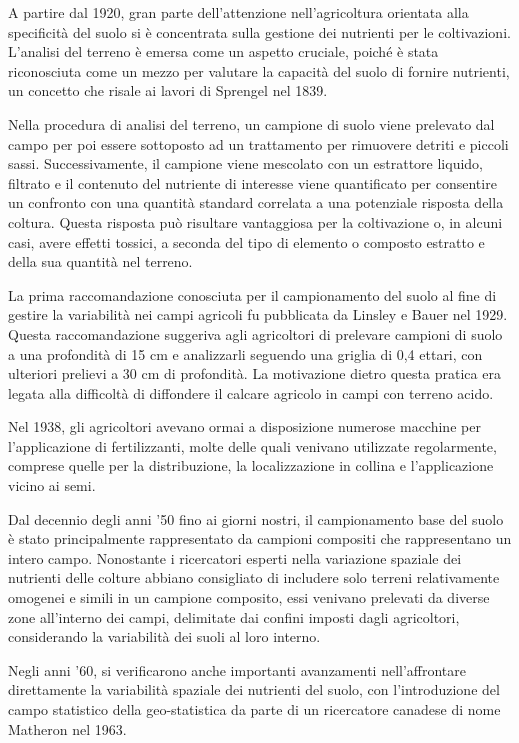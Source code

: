 A partire dal 1920, gran parte dell'attenzione nell'agricoltura orientata alla specificità del suolo si è concentrata sulla gestione dei nutrienti per le coltivazioni. L'analisi del terreno è emersa come un aspetto cruciale, poiché è stata riconosciuta come un mezzo per valutare la capacità del suolo di fornire nutrienti, un concetto che risale ai lavori di Sprengel nel 1839. 

Nella procedura di analisi del terreno, un campione di suolo viene prelevato dal campo per poi essere sottoposto ad un trattamento per rimuovere detriti e piccoli sassi. Successivamente, il campione viene mescolato con un estrattore liquido, filtrato e il contenuto del nutriente di interesse viene quantificato per consentire un confronto con una quantità standard correlata a una potenziale risposta della coltura. Questa risposta può risultare vantaggiosa per la coltivazione o, in alcuni casi, avere effetti tossici, a seconda del tipo di elemento o composto estratto e della sua quantità nel terreno. 

La prima raccomandazione conosciuta per il campionamento del suolo al fine di gestire la variabilità nei campi agricoli fu pubblicata da Linsley e Bauer nel 1929. Questa raccomandazione suggeriva agli agricoltori di prelevare campioni di suolo a una profondità di 15 cm e analizzarli seguendo una griglia di 0,4 ettari, con ulteriori prelievi a 30 cm di profondità. La motivazione dietro questa pratica era legata alla difficoltà di diffondere il calcare agricolo in campi con terreno acido.

Nel 1938, gli agricoltori avevano ormai a disposizione numerose macchine per l'applicazione di fertilizzanti, molte delle quali venivano utilizzate regolarmente, comprese quelle per la distribuzione, la localizzazione in collina e l'applicazione vicino ai semi.

Dal decennio degli anni '50 fino ai giorni nostri, il campionamento base del suolo è stato principalmente rappresentato da campioni compositi che rappresentano un intero campo. Nonostante i ricercatori esperti nella variazione spaziale dei nutrienti delle colture abbiano consigliato di includere solo terreni relativamente omogenei e simili in un campione composito, essi venivano prelevati da diverse zone all'interno dei campi, delimitate dai confini imposti dagli agricoltori, considerando la variabilità dei suoli al loro interno. 

Negli anni '60, si verificarono anche importanti avanzamenti nell'affrontare direttamente la variabilità spaziale dei nutrienti del suolo, con l'introduzione del campo statistico della geo-statistica da parte di un ricercatore canadese di nome Matheron nel 1963.

